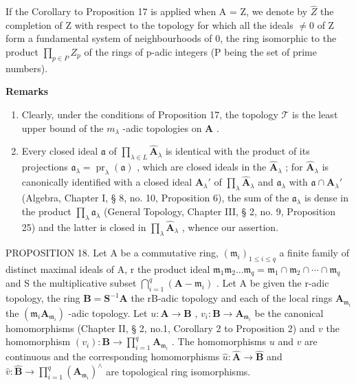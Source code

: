 If the Corollary to Proposition 17 is applied when A = Z, we denote by \(\hat{Z}\) the completion of Z with respect to the topology for which all the ideals \(\neq0\) of Z form a fundamental system of neighbourhoods of 0, the ring isomorphic to the product \(\prod_{p\in P}Z_{p}\) of the rings of p-adic integers (P being the set of prime numbers).

\textbf{Remarks}\par

\begin{enumerate}
\def\labelenumi{(\arabic{enumi})}
\item
  Clearly, under the conditions of Proposition 17, the topology \(\mathcal{T}\) is the least upper bound of the \(m_{\lambda}\) -adic topologies on \(\mathbf{A}\) .
\item
  Every closed ideal \(\mathfrak{a}\) of \(\prod_{\lambda \in L} \hat{\mathbf{A}}_{\lambda}\) is identical with the product of its projections \(\mathfrak{a}_{\lambda} = \operatorname{pr}_{\lambda}(\mathfrak{a})\) , which are closed ideals in the \(\hat{\mathbf{A}}_{\lambda}\) ; for \(\hat{\mathbf{A}}_{\lambda}\) is canonically identified with a closed ideal \(\mathbf{A}_{\lambda}'\) of \(\prod_{\lambda} \hat{\mathbf{A}}_{\lambda}\) and \(\mathfrak{a}_{\lambda}\) with \(\mathfrak{a} \cap \mathbf{A}_{\lambda}'\) (Algebra, Chapter I, § 8, no. 10, Proposition 6), the sum of the \(\mathfrak{a}_{\lambda}\) is dense in the product \(\prod_{\lambda} \mathfrak{a}_{\lambda}\) (General Topology, Chapter III, § 2, no. 9, Proposition 25) and the latter is closed in \(\prod_{\lambda} \hat{\mathbf{A}}_{\lambda}\) , whence our assertion.
\end{enumerate}

PROPOSITION 18. Let A be a commutative ring, \((\mathfrak{m}_i)_{1 \leqslant i \leqslant q}\) a finite family of distinct maximal ideals of A, r the product ideal \(\mathfrak{m}_1\mathfrak{m}_2 \ldots \mathfrak{m}_q = \mathfrak{m}_1 \cap \mathfrak{m}_2 \cap \cdots \cap \mathfrak{m}_q\) and S the multiplicative subset \(\bigcap_{i=1}^{q} (\mathbf{A} - \mathfrak{m}_i)\) . Let A be given the r-adic topology, the ring \(\mathbf{B} = \mathbf{S}^{-1}\mathbf{A}\) the rB-adic topology and each of the local rings \(\mathbf{A}_{\mathfrak{m}_i}\) the \((\mathfrak{m}_i\mathbf{A}_{\mathfrak{m}_i})\) -adic topology. Let \(u: \mathbf{A} \to \mathbf{B}\) , \(v_i: \mathbf{B} \to \mathbf{A}_{\mathfrak{m}_i}\) be the canonical homomorphisms (Chapter II, § 2, no.1, Corollary 2 to Proposition 2) and \(v\) the homomorphism \((v_i): \mathbf{B} \to \prod_{i=1}^{q} \mathbf{A}_{\mathfrak{m}_i}\) . The homomorphisms \(u\) and \(v\) are continuous and the corresponding homomorphisms \(\hat{u}: \hat{\mathbf{A}} \to \hat{\mathbf{B}}\) and \(\hat{v}: \hat{\mathbf{B}} \to \prod_{i=1}^{q} (\mathbf{A}_{\mathfrak{m}_i})^{\wedge}\) are topological ring isomorphisms.

